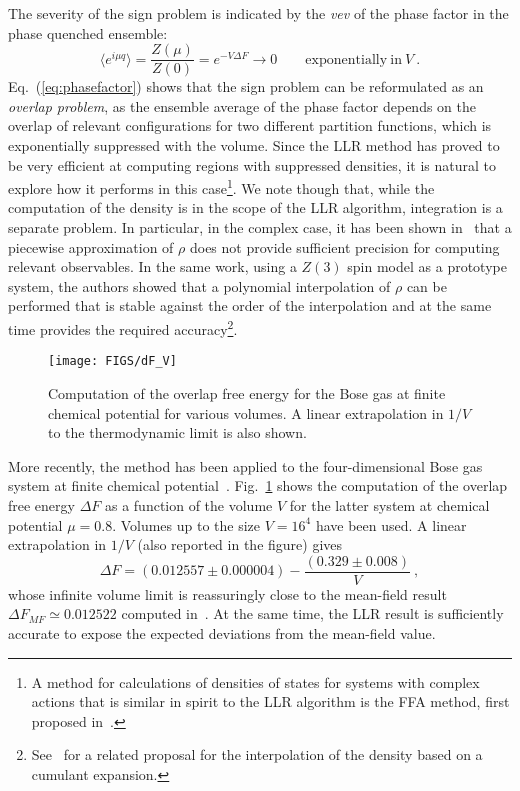 \documentclass[a4paper]{jpconf}
\begin{document}
The severity of the sign problem is indicated by the {\em vev} of the
phase factor in the phase quenched ensemble:
\begin{equation}
\label{eq:phasefactor}
  \langle e^{i\mu  q} \rangle = \frac{Z(\mu)}{Z(0)} = e^{- V \Delta F }
\to 0 \qquad \mathrm{exponentially~in~} V \ .
\end{equation}
Eq.~(\ref{eq:phasefactor}) shows that the sign problem can be
reformulated as an {\em overlap problem}, as 
the ensemble average of the phase factor depends on the overlap
of relevant configurations for two different partition functions, which is
exponentially suppressed with the volume. Since the LLR method has
proved to be very efficient at computing regions with suppressed
densities, it is natural to explore how it performs in this
case\footnote{A method for calculations of densities of states for
  systems with complex actions that is
  similar in spirit to the LLR algorithm is the FFA method, first proposed
  in~\cite{Giuliani:2016tlu}.}. We note though that, while the
computation of the density is in the scope of the LLR algorithm,
integration is a separate problem. In particular, in the complex case,
it has been shown 
in~\cite{Langfeld:2014nta} that a piecewise approximation of $\rho$ does not
provide sufficient precision for computing relevant observables. In
the same work, using a $Z(3)$ spin model as a prototype system, the
authors showed that a polynomial interpolation of $\rho$ can be
performed that is stable against the order of the interpolation and at
the same time provides the required
accuracy\footnote{See~\cite{Garron:2017fta} for a related proposal for the
  interpolation of the density based on a cumulant expansion.}.

%
\begin{figure}[t]
\begin{center}
  \texttt{[image: FIGS/dF\_V]}
\caption{Computation of the overlap free energy for the Bose gas at
  finite chemical potential for various volumes. A linear extrapolation
  in $1/V$ to the thermodynamic limit is also shown.\label{fig:4}} 
\end{center}
\end{figure}
%
More recently, the method has been applied to the four-dimensional
Bose gas system at finite chemical
potential~\cite{Francesconi:2019nph}. Fig.~\ref{fig:4}
shows the computation of the overlap
free energy $\Delta F$ as a function of the volume $V$ for the latter
system at chemical potential $\mu = 0.8$. Volumes up to the size $V =
16^4$ have been used. A linear extrapolation in $1/V$ (also reported in the figure) gives
\begin{equation}
\Delta F = (0.012557 \pm 0.000004) - \frac{(0.329 \pm 0.008)}{V} \ ,
\end{equation}
whose infinite volume limit is reassuringly close to the mean-field
result $\Delta F_{MF}  \simeq 0.012522$ computed
in~\cite{Aarts:2009hn}. At the same time, the LLR result is sufficiently
accurate to expose the expected deviations from the mean-field value. 
\end{document}
